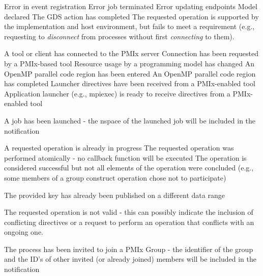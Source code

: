 \begin{constantdesc}
%
Error in event registration
%
Error job terminated
%
Error updating endpoints
%
Model declared
%
The \ac{GDS} action has completed
%
The requested operation is supported by the implementation and host environment, but fails to meet a requirement (e.g., requesting to \textit{disconnect} from processes without first \textit{connecting} to them).

A tool or client has connected to the \ac{PMIx} server
%
Connection has been requested by a PMIx-based tool
%
Resource usage by a programming model has changed
%
An OpenMP parallel code region has been entered
%
An OpenMP parallel code region has completed
%
Launcher directives have been received from a PMIx-enabled tool
%
Application launcher (e.g., mpiexec) is ready to receive directives from a PMIx-enabled tool

%
A job has been launched - the nspace of the launched job will be included in the notification

%
A requested operation is already in progress
%
The requested operation was performed atomically - no callback function will be executed
%
The operation is considered successful but not all elements of the operation were concluded (e.g., some members of a group construct operation chose not to participate)

%
The provided key has already been published on a different data range

%
The requested operation is not valid - this can possibly indicate the inclusion of conflicting directives or a request to perform an operation that conflicts with an ongoing one.

%
The process has been invited to join a \ac{PMIx} Group - the identifier of the group and the ID's of other invited (or already joined) members will be included in the notification


\end{constantdesc}
